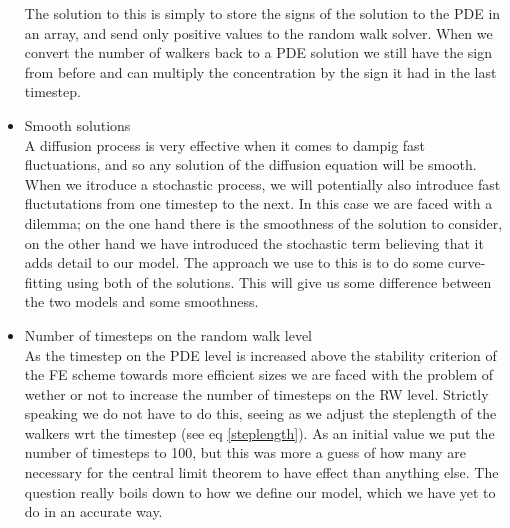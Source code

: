 \begin{itemize}
 The solution to this is simply to store the signs of the solution to the PDE in an array, and send only positive values to the random walk solver. 
 When we convert the number of walkers back to a PDE solution we still have the sign from before and can multiply the concentration by the sign it had in the last timestep. 
 \item Smooth solutions\\
 A diffusion process is very effective when it comes to dampig fast fluctuations, and so any solution of the diffusion equation will be smooth. 
 When we itroduce a stochastic process, we will potentially also introduce fast fluctutations from one timestep to the next. 
 In this case we are faced with a dilemma; on the one hand there is the smoothness of the solution to consider, on the other hand we have introduced the stochastic term believing that it adds detail to our model. 
 The approach we use to this is to do some curve-fitting using both of the solutions. 
 This will give us some difference between the two models and some smoothness.
 \item Number of timesteps on the random walk level\\
 As the timestep on the PDE level is increased above the stability criterion of the FE scheme towards more efficient sizes we are faced with the problem of wether or not to increase the number of timesteps on the RW level. 
 Strictly speaking we do not have to do this, seeing as we adjust the steplength of the walkers wrt the timestep (see eq \ref{steplength}). 
 As an initial value we put the number of timesteps to 100, but this was more a guess of how many are necessary for the central limit theorem to have effect than anything else. 
 The question really boils down to how we define our model, which we have yet to do in an accurate way.

\end{itemize}

